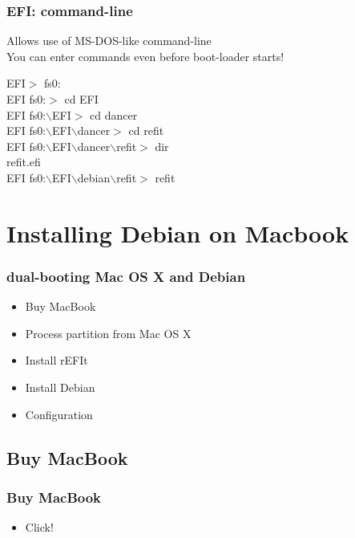 \documentclass[cjk,dvipdfmx]{beamer}
\begin{document}
\begin{frame}
\frametitle{EFI: command-line}

Allows use of MS-DOS-like command-line\\
You can enter commands even before boot-loader starts!

EFI$>$ fs0:\\
EFI fs0:$>$ cd EFI\\
EFI fs0:$\backslash{}$EFI$>$ cd dancer\\
EFI fs0:$\backslash{}$EFI$\backslash{}$dancer$>$ cd refit\\
EFI fs0:$\backslash{}$EFI$\backslash{}$dancer$\backslash{}$refit$>$ dir\\
refit.efi\\
 EFI fs0:$\backslash{}$EFI$\backslash{}$debian$\backslash{}$refit$>$ refit

\end{frame}

\section{Installing Debian on Macbook}

\begin{frame}
 \frametitle{dual-booting Mac OS X and Debian}
 \begin{minipage}{0.5\hsize}
  \begin{itemize}
   \item Buy MacBook
   \item Process partition from Mac OS X
   \item Install rEFIt 
   \item Install Debian
   \item Configuration
  \end{itemize}
 \end{minipage}
\end{frame}

\subsection{Buy MacBook} 

\begin{frame}
 \frametitle{Buy MacBook}
 \begin{minipage}{0.5\hsize}
  \begin{itemize}
   \item Click!
  \end{itemize}
 \end{minipage}
\end{frame}
\end{document}
